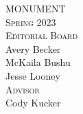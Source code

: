 \begin{titlingpage*}
    \begin{center}
        {\HUGE MONUMENT}\\[\baselineskip]
        {\Large\textsc{Spring 2023}}\\
        \vspace*{\fill}
        {
            \textsc{Editorial Board}\\
            Avery Becker\\
            McKaila Bushu\\
            Jesse Looney\\[\baselineskip * 4]
        }
        {
            \textsc{Advisor}\\
            Cody Kucker\\[\baselineskip * 5]
        }
    \end{center}
    \titlingpageend{\clearpage}{\clearpage}
\end{titlingpage*}